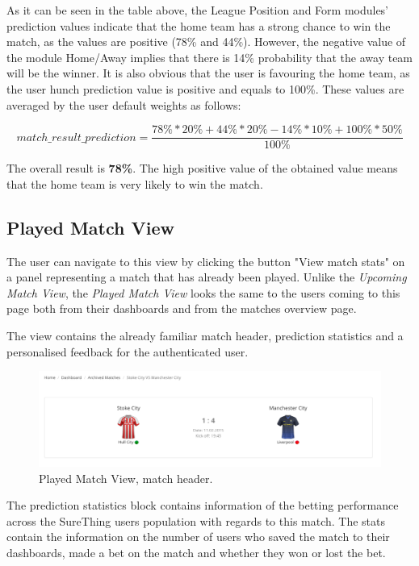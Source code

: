 As it can be seen in the table above, the League Position and Form modules’ prediction values indicate that the home team has a strong chance to win the match, as the values are positive (78\% and 44\%). However, the negative value of the module Home/Away implies that there is 14\% probability that the away team will be the winner. It is also obvious that the user is favouring the home team, as the user hunch prediction value is positive and equals to 100\%. These values are averaged by the user default weights as follows:

\begin{equation}
  match\_result\_prediction = \frac{78\%*20\% + 44\%*20\% -14\%*10\% + 100\%*50\%}{100\%}
\end{equation}

The overall result is \textbf{78\%}. The high positive value of the obtained value means that the home team is very likely to win the match.


\subsection{Played Match View}
\label{subsec:playedmatchview}
The user can navigate to this view by clicking the button "View match stats" on a panel representing a match that has already been played. Unlike the \emph{Upcoming Match View}, the \emph{Played Match View} looks the same to the users coming to this page both from their dashboards and from the matches overview page.

The view contains the already familiar match header, prediction statistics and a personalised feedback for the authenticated user.

\begin{figure}[H]
	\begin{center}
		\includegraphics[width=.90\textwidth]{impl/images/matchHeader}
		\caption{Played Match View, match header.} \label{fig:matchheader}
	\end{center}
\end{figure}

The prediction statistics block contains information of the betting performance across the SureThing users population with regards to this match. The stats contain the information on the number of users who saved the match to their dashboards, made a bet on the match and whether they won or lost the bet.

